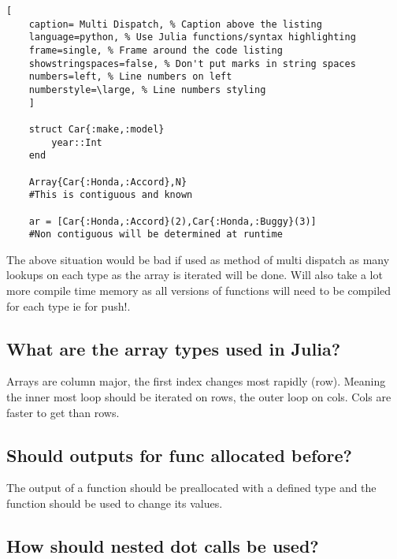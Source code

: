 \documentclass[11pt]{scrartcl} %
\begin{document}
\begin{lstlisting}[
	caption= Multi Dispatch, % Caption above the listing
	language=python, % Use Julia functions/syntax highlighting
	frame=single, % Frame around the code listing
	showstringspaces=false, % Don't put marks in string spaces
	numbers=left, % Line numbers on left
	numberstyle=\large, % Line numbers styling
	]

	struct Car{:make,:model}
		year::Int
	end

	Array{Car{:Honda,:Accord},N} 
	#This is contiguous and known

	ar = [Car{:Honda,:Accord}(2),Car{:Honda,:Buggy}(3)] 
	#Non contiguous will be determined at runtime

\end{lstlisting}

The above situation would be bad if used as method of multi dispatch as many lookups on each
type as the array is iterated will be done. Will also take a lot more compile time memory
as all versions of functions will need to be compiled for each type ie for push!.

\subsection{What are the array types used in Julia?}

Arrays are column major, the first index changes most rapidly (row). Meaning the inner most loop
should be iterated on rows, the outer loop on cols. Cols are faster to get than rows.

\subsection{Should outputs for func allocated before?}

The output of a function should be preallocated with a defined type and the function should be
used to change its values.

\subsection{How should nested dot calls be used?}




\end{document}
